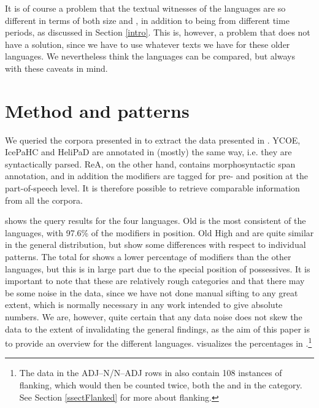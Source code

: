 \documentclass[output=paper,colorlinks,citecolor=brown,draft]{langscibook}
\begin{document}
It is of course a problem that the textual witnesses of the languages are so different in terms of both size and , in addition to being from different time periods, as discussed in Section \ref{intro}. This is, however, a problem that does not have a solution, since we have to use whatever texts we have for these older languages. We nevertheless think the languages can be compared, but always with these caveats in mind.

\section{Method and patterns}\label{sectmethod}\largerpage

We queried the corpora presented in  to extract the data presented in . YCOE, IcePaHC and HeliPaD are annotated in (mostly) the same way, i.e. they are syntactically parsed. ReA, on the other hand, contains morphosyntactic span annotation, and in addition the modifiers are tagged for pre- and  position at the part-of-speech level. It is therefore possible to retrieve comparable information from all the corpora.

 shows the query results for the four languages. Old  is the most consistent of the languages, with 97.6\% of the modifiers in  position. Old High  and  are quite similar in the general distribution, but show some differences with respect to individual patterns. The total for  shows a lower percentage of  modifiers than the other languages, but this is in large part due to the special position of possessives. It is important to note that these are relatively rough categories and that there may be some noise in the data, since we have not done manual sifting to any great extent, which is normally necessary in any  work intended to give absolute numbers. We are, however, quite certain that any data noise does not skew the data to the extent of invalidating the general findings, as the aim of this paper is to provide an overview for the different languages.  visualizes the percentages in .\footnote{The data in the ADJ--N/N--ADJ rows in  also contain 108 instances of flanking, which would then be counted twice, both the  and in the  category. See Section \ref{ssectFlanked} for more about flanking.}\largerpage[2]
\end{document}
